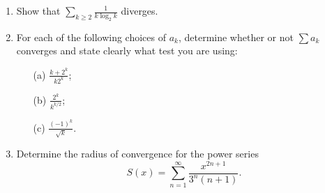 \documentclass[11pt]{article}
\begin{document}
\begin{enumerate}
\item
Show that $\sum_{k \geq 2} \frac{1}{k \log_2 k}$ diverges.


\item
For each of the following choices of $a_k$, determine whether or not $\sum a_k$ converges and state clearly what test you are using:
\begin{itemize}
\item[(a)] $\frac{k+2^k}{k 2^k}$;
\item[(b)] $\frac{2^k}{k^{k/2}}$; 
\item[(c)] $\frac{(-1)^k}{\sqrt{k}}$.
\end{itemize}

\item
Determine the radius of convergence for the power series 
\[S(x) = \sum_{n=1}^\infty \frac{x^{2n+1}}{3^n (n+1)}.\]

\end{enumerate}
\end{document}
